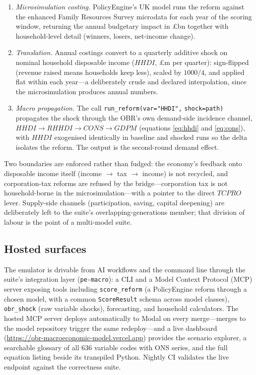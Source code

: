 \begin{enumerate}
\item \emph{Microsimulation costing.} PolicyEngine's UK model \citep{policyengine} runs the reform against the enhanced Family Resources Survey microdata for each year of the scoring window, returning the annual budgetary impact in \pounds bn together with household-level detail (winners, losers, net-income change).
\item \emph{Translation.} Annual costings convert to a quarterly additive shock on nominal household disposable income ($HHDI$, \pounds m per quarter): sign-flipped (revenue raised means households keep less), scaled by $1000/4$, and applied flat within each year---a deliberately crude and declared interpolation, since the microsimulation produces annual numbers.
\item \emph{Macro propagation.} The call \texttt{run\_reform(var="HHDI",} \texttt{shock=path)} propagates the shock through the OBR's own demand-side incidence channel, $HHDI \to RHHDI \to CONS \to GDPM$ (equations \eqref{eq:hhdi} and \eqref{eq:cons}), with $HHDI$ exogenised identically in baseline and shocked runs so the delta isolates the reform. The output is the second-round demand effect.
\end{enumerate}

Two boundaries are enforced rather than fudged: the economy's feedback onto disposable income itself (income $\to$ tax $\to$ income) is not recycled, and corporation-tax reforms are refused by the bridge---corporation tax is not household-borne in the microsimulation---with a pointer to the direct $TCPRO$ lever. Supply-side channels (participation, saving, capital deepening) are deliberately left to the suite's overlapping-generations member; that division of labour is the point of a multi-model suite.

\subsection{Hosted surfaces}

The emulator is drivable from AI workflows and the command line through the suite's integration layer (\texttt{pe-macro}): a CLI and a Model Context Protocol (MCP) server exposing tools including \texttt{score\_reform} (a PolicyEngine reform through a chosen model, with a common \texttt{ScoreResult} schema across model classes), \texttt{obr\_shock} (raw variable shocks), forecasting, and household calculators. The hosted MCP server deploys automatically to Modal on every merge---merges to the model repository trigger the same redeploy---and a live dashboard (\url{https://obr-macroeconomic-model.vercel.app}) provides the scenario explorer, a searchable glossary of all 636 variable codes with ONS series, and the full equation listing beside its transpiled Python. Nightly CI validates the live endpoint against the correctness suite.
